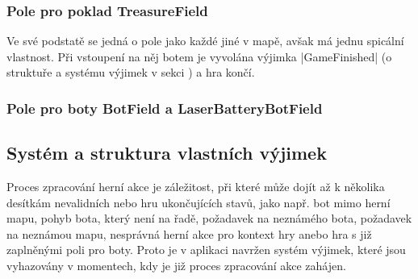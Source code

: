 \subsubsection{Pole pro poklad TreasureField}

Ve své podstatě se jedná o pole jako každé jiné v mapě, avšak má jednu spicální vlastnost. Při vstoupení na něj botem je vyvolána výjimka \ic|GameFinished| (o struktuře a systému výjimek v sekci ) a hra končí. 

\subsubsection{Pole pro boty BotField a LaserBatteryBotField}

\subsection{Systém a struktura vlastních výjimek}
\label{subsec:custom-exceptions}

Proces zpracování herní akce je záležitost, při které může dojít až k několika desítkám nevalidních nebo hru ukončujících stavů, jako např. bot mimo herní mapu, pohyb bota, který není na řadě, požadavek na neznámého bota, požadavek na neznámou mapu, nesprávná herní akce pro kontext hry anebo hra s již zaplněnými poli pro boty. Proto je v aplikaci navržen systém výjimek, které jsou vyhazovány v momentech, kdy je již proces zpracování akce zahájen.

